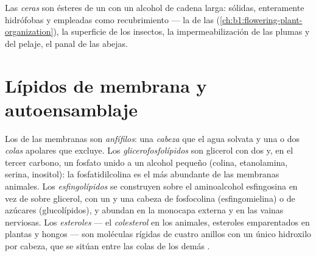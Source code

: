\begin{definition}[Ceras]\label{def:b1:lipids:wax}
Las \emph{ceras} son ésteres de un  con un alcohol de
cadena larga: sólidas, enteramente hidrófobas y empleadas como recubrimiento
--- la  de las 
(\cref{ch:b1:flowering-plant-organization}), la superficie de los insectos,
la impermeabilización de las plumas y del pelaje, el panal de las abejas.
\end{definition}

\section{Lípidos de membrana y autoensamblaje}

\begin{definition}\label{def:b1:lipids:amphiphilic}
Los  de las membranas son \emph{anfífilos}: una \emph{cabeza}  que el agua solvata y una o dos
\emph{colas} apolares que excluye. Los
\emph{glicerofosfolípidos} son glicerol con dos  y, en el tercer carbono, un fosfato unido a un alcohol  pequeño
(colina, etanolamina, serina, inositol): la fosfatidilcolina es el 
más abundante de las membranas animales. Los
\emph{esfingolípidos} se construyen sobre el
aminoalcohol esfingosina en vez de sobre glicerol, con un  y una
cabeza de fosfocolina (esfingomielina) o de azúcares (glucolípidos), y
abundan en la monocapa externa y en las vainas nerviosas. Los
\emph{esteroles} --- el \emph{colesterol}
en los animales, esteroles emparentados en plantas y hongos --- son
moléculas rígidas de cuatro anillos con un único hidroxilo por cabeza, que
se sitúan entre las colas de los demás .
\end{definition}

